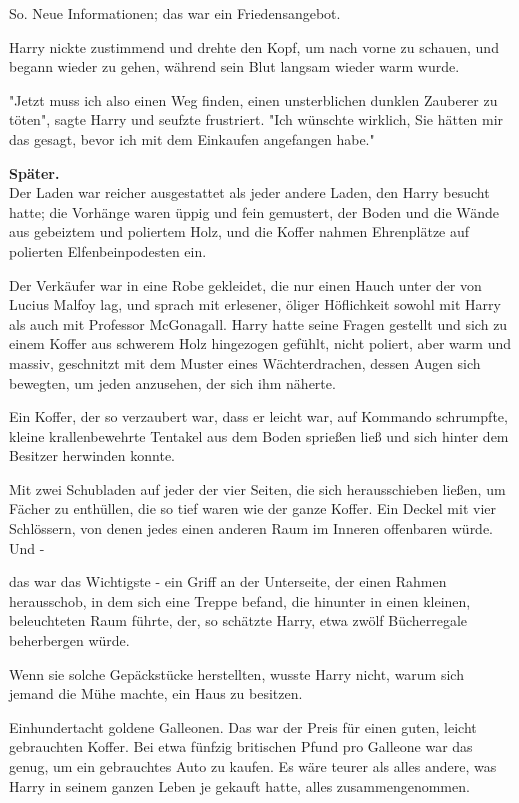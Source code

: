 {So. Neue Informationen; das war ein Friedensangebot.

Harry nickte zustimmend und drehte den Kopf, um nach vorne zu schauen, und begann wieder zu gehen, während sein Blut langsam wieder warm wurde.

"Jetzt muss ich also einen Weg finden, einen unsterblichen dunklen Zauberer zu töten", sagte Harry und seufzte frustriert. "Ich wünschte wirklich, Sie hätten mir das gesagt, bevor ich mit dem Einkaufen angefangen habe."

\textbf{Später.}\\ Der Laden war reicher ausgestattet als jeder andere Laden, den Harry besucht hatte; die Vorhänge waren üppig und fein gemustert, der Boden und die Wände aus gebeiztem und poliertem Holz, und die Koffer nahmen Ehrenplätze auf polierten Elfenbeinpodesten ein.

Der Verkäufer war in eine Robe gekleidet, die nur einen Hauch unter der von Lucius Malfoy lag, und sprach mit erlesener, öliger Höflichkeit sowohl mit Harry als auch mit Professor McGonagall. Harry hatte seine Fragen gestellt und sich zu einem Koffer aus schwerem Holz hingezogen gefühlt, nicht poliert, aber warm und massiv, geschnitzt mit dem Muster eines Wächterdrachen, dessen Augen sich bewegten, um jeden anzusehen, der sich ihm näherte.

Ein Koffer, der so verzaubert war, dass er leicht war, auf Kommando schrumpfte, kleine krallenbewehrte Tentakel aus dem Boden sprießen ließ und sich hinter dem Besitzer herwinden konnte.

Mit zwei Schubladen auf jeder der vier Seiten, die sich herausschieben ließen, um Fächer zu enthüllen, die so tief waren wie der ganze Koffer. Ein Deckel mit vier Schlössern, von denen jedes einen anderen Raum im Inneren offenbaren würde. Und -

das war das Wichtigste - ein Griff an der Unterseite, der einen Rahmen herausschob, in dem sich eine Treppe befand, die hinunter in einen kleinen, beleuchteten Raum führte, der, so schätzte Harry, etwa zwölf Bücherregale beherbergen würde.

Wenn sie solche Gepäckstücke herstellten, wusste Harry nicht, warum sich jemand die Mühe machte, ein Haus zu besitzen.

Einhundertacht goldene Galleonen. Das war der Preis für einen guten, leicht gebrauchten Koffer. Bei etwa fünfzig britischen Pfund pro Galleone war das genug, um ein gebrauchtes Auto zu kaufen. Es wäre teurer als alles andere, was Harry in seinem ganzen Leben je gekauft hatte, alles zusammengenommen.

}

